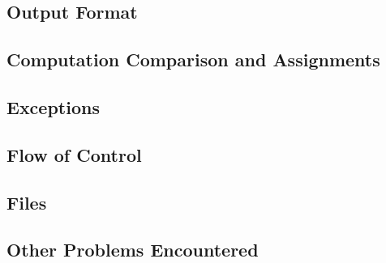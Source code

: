 \subsection{Output Format}
\subsection{Computation Comparison and Assignments}
\subsection{Exceptions}
\subsection{Flow of Control}
\subsection{Files}
\subsection{Other Problems Encountered}